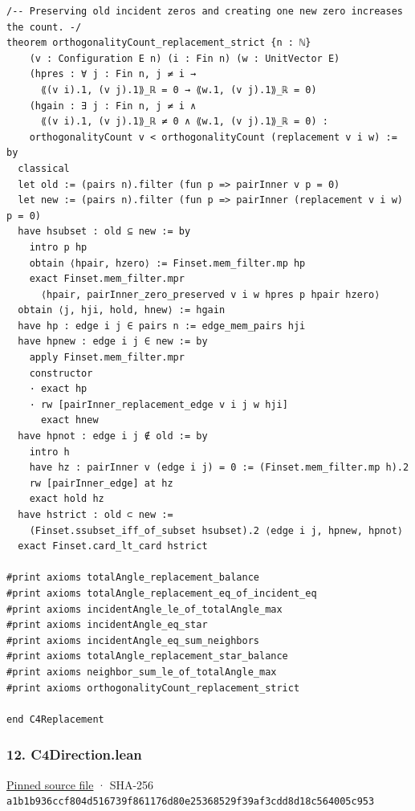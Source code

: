 \documentclass[11pt,a4paper]{article}
\begin{document}
\begin{Verbatim}[breaklines,breakanywhere,fontsize=\footnotesize]
/-- Preserving old incident zeros and creating one new zero increases the count. -/
theorem orthogonalityCount_replacement_strict {n : ℕ}
    (v : Configuration E n) (i : Fin n) (w : UnitVector E)
    (hpres : ∀ j : Fin n, j ≠ i →
      ⟪(v i).1, (v j).1⟫_ℝ = 0 → ⟪w.1, (v j).1⟫_ℝ = 0)
    (hgain : ∃ j : Fin n, j ≠ i ∧
      ⟪(v i).1, (v j).1⟫_ℝ ≠ 0 ∧ ⟪w.1, (v j).1⟫_ℝ = 0) :
    orthogonalityCount v < orthogonalityCount (replacement v i w) := by
  classical
  let old := (pairs n).filter (fun p => pairInner v p = 0)
  let new := (pairs n).filter (fun p => pairInner (replacement v i w) p = 0)
  have hsubset : old ⊆ new := by
    intro p hp
    obtain ⟨hpair, hzero⟩ := Finset.mem_filter.mp hp
    exact Finset.mem_filter.mpr
      ⟨hpair, pairInner_zero_preserved v i w hpres p hpair hzero⟩
  obtain ⟨j, hji, hold, hnew⟩ := hgain
  have hp : edge i j ∈ pairs n := edge_mem_pairs hji
  have hpnew : edge i j ∈ new := by
    apply Finset.mem_filter.mpr
    constructor
    · exact hp
    · rw [pairInner_replacement_edge v i j w hji]
      exact hnew
  have hpnot : edge i j ∉ old := by
    intro h
    have hz : pairInner v (edge i j) = 0 := (Finset.mem_filter.mp h).2
    rw [pairInner_edge] at hz
    exact hold hz
  have hstrict : old ⊂ new :=
    (Finset.ssubset_iff_of_subset hsubset).2 ⟨edge i j, hpnew, hpnot⟩
  exact Finset.card_lt_card hstrict

#print axioms totalAngle_replacement_balance
#print axioms totalAngle_replacement_eq_of_incident_eq
#print axioms incidentAngle_le_of_totalAngle_max
#print axioms incidentAngle_eq_star
#print axioms incidentAngle_eq_sum_neighbors
#print axioms totalAngle_replacement_star_balance
#print axioms neighbor_sum_le_of_totalAngle_max
#print axioms orthogonalityCount_replacement_strict

end C4Replacement
\end{Verbatim}

\subsubsection{12. C4Direction.lean}\label{c4direction.lean}

\href{https://github.com/mpelteshki/climbing-to-the-frontier/blob/29fbb70da18564048f62492e43870f2f96a65463/cagent/p1/C4Direction.lean}{Pinned source file} · SHA-256 \texttt{a1b1b936\allowbreak{}ccf804d5\allowbreak{}16739f86\allowbreak{}1176d80e\allowbreak{}25368529\allowbreak{}f39af3cd\allowbreak{}d8d18c56\allowbreak{}4005c953}
\end{document}

